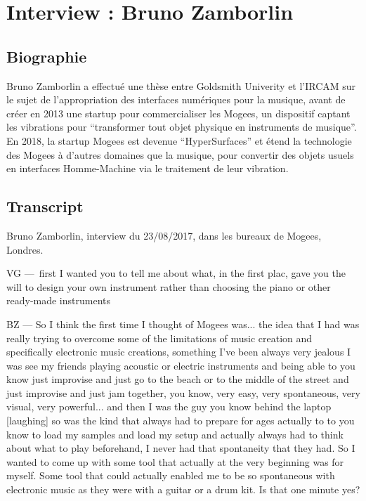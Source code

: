 \chapter{Interview : Bruno Zamborlin}
\label{appendix:zamborlin}

\section*{Biographie}
\noindent Bruno Zamborlin a effectué une thèse entre Goldsmith Univerity et l'IRCAM sur le sujet de l'appropriation des interfaces numériques pour la musique, avant de créer en 2013 une startup pour commercialiser les Mogees, un dispositif captant les vibrations pour ``transformer tout objet physique en instruments de musique''. En 2018, la startup Mogees est devenue ``HyperSurfaces'' et étend la technologie des Mogees à d'autres domaines que la musique, pour convertir des objets usuels en interfaces Homme-Machine via le traitement de leur vibration.

\section*{Transcript}

\noindent Bruno Zamborlin, interview du 23/08/2017, dans les bureaux de Mogees, Londres.

VG — first I wanted you to tell me about what, in the first plac, gave you the will to design your own instrument rather than choosing the piano or other ready-made instruments 

BZ — So I think the first time I thought of Mogees was... the idea that I had was really trying to overcome some of the limitations of music creation and specifically electronic music creations, something I've been always very jealous I was see my friends playing acoustic or electric instruments and being able to you know just improvise and just go to the beach or to the middle of the street and just improvise and just jam together, you know, very easy, very spontaneous, very visual, very powerful... and then I was the guy you know behind the laptop [laughing] so was the kind that always had to prepare for ages actually to to you know to load my samples and load my setup and actually always had to think about what to play beforehand, I never had that spontaneity that they had. So I wanted to come up with some tool that actually at the very beginning was for myself. Some tool that could actually enabled me to be so spontaneous with electronic music as they were with a guitar or a drum kit. Is that one minute yes? 

